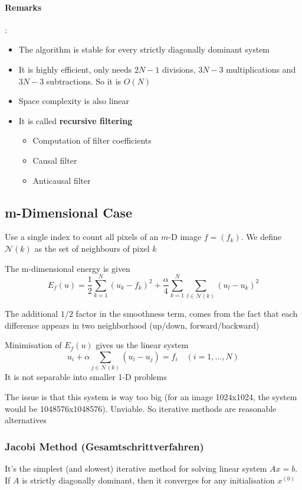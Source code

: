 \documentclass{article}
\begin{document}
\paragraph{Remarks}: 
\begin{itemize}
  \item The algorithm is stable for every strictly diagonally dominant system
  \item It is highly efficient, only needs $2N-1$ divisions, $3N-3$ multiplications and $3N-3$ subtractions. So it is $O(N)$
  \item Space complexity is also linear
  \item It is called \textbf{recursive filtering}
  \begin{itemize}
    \item Computation of filter coefficients
    \item Causal filter
    \item Anticausal filter
  \end{itemize}
\end{itemize}
\subsection{m-Dimensional Case}
Use a single index to count all pixels of an $m$-D image $f=(f_k)$. We define $\mathcal{N}(k)$ as the set of neighbours of pixel $k$

The m-dimensional energy is given
\[E_f(u) = \frac{1}{2}\sum_{k=1}^N(u_k - f_k)^2 + \frac{\alpha}{4}\sum_{k=1}^N\sum_{l\in \mathcal{N}(k)}(u_l - u_k)^2\]

The additional $1/2$ factor in the smoothness term, comes from the fact that each difference appears in two neighborhood (up/down, forward/backward)

Minimisation of $E_f(u)$ gives us the linear system
\[u_i + \alpha \sum_{j\in \mathcal{N}(k)}(u_i-u_j) = f_i \quad (i=1,...,N)\]
It is not separable into smaller 1-D problems

The issue is that this system is way too big (for an image 1024x1024, the system would be 1048576x1048576). Unviable. So iterative methods are reasonable alternatives

\subsubsection{Jacobi Method (Gesamtschrittverfahren)}
It's the simplest (and slowest) iterative method for solving linear system $Ax = b$. If $A$ is strictly diagonally dominant, then it converges for any initialisation $x^{(0)}$
\end{document}
